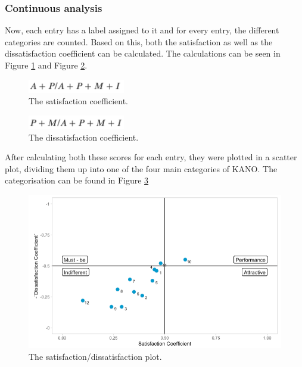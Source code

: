 \subsubsection{Continuous analysis}
Now, each entry has a label assigned to it and for every entry, the different categories are counted. Based on this, both the satisfaction as well as the dissatisfaction coefficient can be calculated. The calculations can be seen in Figure \ref{fig:satisfactionCoef} and Figure \ref{fig:dissatisfactionCoef}.
\begin{figure}[!htb]
	\centering
	\includegraphics[width=120pt]{../LaTeX/Figures/Kano/SatisfactionCoef.png}
	\caption{The satisfaction coefficient.}
	\label{fig:satisfactionCoef}
\end{figure}
\begin{figure}[!htb]
	\centering
	\includegraphics[width=120pt]{../LaTeX/Figures/Kano/DissatisfactionCoef.png}
	\caption{The dissatisfaction coefficient.}
	\label{fig:dissatisfactionCoef}
\end{figure}
\break
After calculating both these scores for each entry, they were plotted in  a scatter plot, dividing them up into one of the four main categories of KANO. The categorisation can be found in Figure \ref{fig:satisfactionPlot}
\begin{figure}[!htb]
	\centering
	\includegraphics[width=375pt]{../LaTeX/Figures/Kano/SatisfactionPlot.png}
	\caption{The satisfaction/dissatisfaction plot.}
	\label{fig:satisfactionPlot}
\end{figure}

